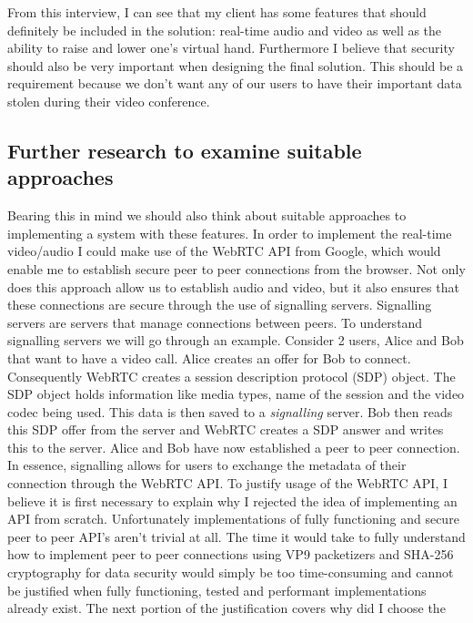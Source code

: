 From this interview, I can see that my client has some features
that should definitely be included in the solution: real-time 
audio and video as well as the ability to raise and lower one's
virtual hand. Furthermore I believe that security should also 
be very important when designing the final solution. This 
should be a requirement because we don't want any of our users
to have their important data stolen during their video
conference. \vspace{0.2cm}

\subsection{Further research to examine suitable approaches}
\label{sec:further}

Bearing this in mind we should also think about suitable 
approaches to implementing a system with these features. In 
order to implement the real-time video/audio I could make use
of the WebRTC API from Google, which would enable me to 
establish secure peer to peer connections from the browser. 
Not only does this approach allow us to establish audio and 
video, but it also ensures that these connections are secure 
through the use of signalling servers. Signalling servers are
servers that manage connections between peers. To understand 
signalling servers we will go through an example. Consider 2 
users, Alice and Bob that want to have a video call. Alice 
creates an offer for Bob to connect. Consequently WebRTC 
creates a session description protocol (SDP) object. The SDP 
object holds information like media types, name of the
session and the video codec being used. This data is then 
saved to a \textit{signalling} server. Bob then reads this SDP
offer from the server and WebRTC creates a SDP answer and
writes this to the server. Alice and Bob have now established 
a peer to peer connection. In essence, signalling allows for 
users to exchange the metadata of their connection through the
WebRTC API. To justify usage of the WebRTC API, I believe it 
is first necessary to explain why I rejected the idea of
implementing an API from scratch. Unfortunately
implementations of fully functioning and secure peer to peer
API's aren't trivial at all. The time it would take to fully
understand how to implement peer to peer connections using 
VP9 packetizers \cite{vp9} and SHA-256 cryptography for data
security would simply be too time-consuming and cannot be
justified when fully functioning, tested and performant 
implementations already exist. The next 
portion of the justification covers why did I choose the
